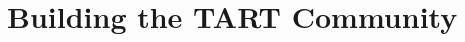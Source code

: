 \documentclass[ignorenonframetext]{beamer}
\begin{document}
% 
% 

\section{Building the TART Community}

\frame{\tableofcontents[currentsection]}
\end{document}
